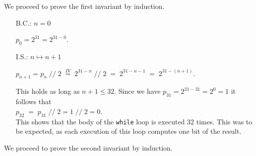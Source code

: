 We proceed to prove the first invariant by induction.  
\begin{enumerate}
\item[B.C.:] $n = 0$

             $p_0 = 2^{31} = 2^{31-0}$. 
\item[I.S.:] $n \mapsto n + 1$

   $p_{n+1} = p_n \;\mathtt{/\!/}\; 2 \;\stackrel{IV}{=}\; 2^{31-n} \;\mathtt{/\!/}\; 2 \;=\; 2^{31-n-1} \;=\; 2^{31-(n+1)}$.

   This holds as long as $n+1 \leq 32$.  Since we have $p_{31} = 2^{31-31} = 2^0 = 1$ it follows that
   \\[0.2cm]
   \hspace*{1.3cm}
   $p_{32} \;=\; p_{31} \;\mathtt{/\!/}\; 2 = 1 \;\mathtt{/\!/}\; 2 = 0$.
   \\[0.2cm]
   This shows that the body of the \texttt{while} loop is executed $32$ times.  This was to be expected, as
   each execution of this loop computes one bit of the result.
\end{enumerate}
We proceed to prove the second invariant by induction.
